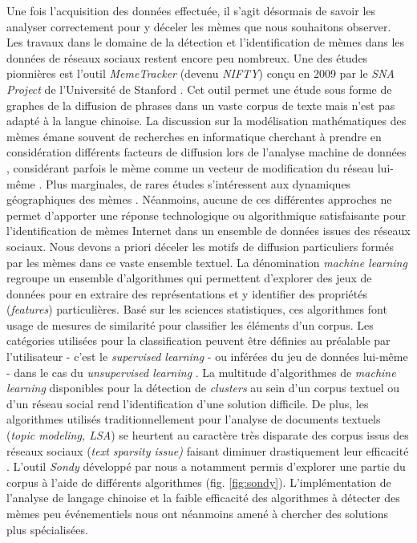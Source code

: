 Une fois l{\textquoteright}acquisition des données effectuée, il s{\textquoteright}agit désormais de savoir les analyser correctement pour y déceler les mèmes que nous souhaitons observer. Les travaux dans le domaine de la détection et l{\textquoteright}identification de mèmes dans les données de réseaux sociaux restent encore peu nombreux. Une des études pionnières est l{\textquoteright}outil \textit{MemeTracker }(devenu \textit{NIFTY}) con\c{c}u en 2009 par le \textit{SNA Project }de l{\textquoteright}Université de Stanford \citep{Leskovec2009}. Cet outil permet une étude sous forme de graphes de la diffusion de phrases dans un vaste corpus de texte mais n{\textquoteright}est pas adapté à la langue chinoise. La discussion sur la modélisation mathématiques des mèmes \citep{Ahmad2006, Nye2011} émane souvent de recherches en informatique cherchant à prendre en considération différents facteurs de diffusion lors de l{\textquoteright}analyse machine de données \citep{Zubiaga2011, Wang2011}, considérant parfois le mème comme un vecteur de modification du réseau lui-m\^eme \citep{Ienco2010}. Plus marginales, de rares études s{\textquoteright}intéressent aux dynamiques géographiques des mèmes \citep{Kamath2013}. Néanmoins, aucune de ces différentes approches ne permet d{\textquoteright}apporter une réponse technologique ou algorithmique satisfaisante pour l{\textquoteright}identification de mèmes Internet dans un ensemble de données issues des réseaux sociaux. Nous devons a priori déceler les motifs de diffusion particuliers formés par les mèmes dans ce vaste ensemble textuel. La dénomination \textit{machine learning }regroupe un ensemble d{\textquoteright}algorithmes qui permettent d{\textquoteright}explorer des jeux de données pour en extraire des représentations et y identifier des propriétés (\textit{features}) particulières. Basé sur les sciences statistiques, ces algorithmes font usage de mesures de similarité pour classifier les éléments d{\textquoteright}un corpus. Les catégories utilisées pour la classification peuvent \^etre définies au préalable par l{\textquoteright}utilisateur - c{\textquoteright}est le \textit{supervised learning} - ou inférées du jeu de données lui-m\^eme - dans le cas du \textit{unsupervised learning} \citep{Breiman2001}. La multitude d{\textquoteright}algorithmes de \textit{machine learning }disponibles pour la détection de \textit{clusters} au sein d{\textquoteright}un corpus textuel ou d{\textquoteright}un réseau social \citep{Nettleton2013, Robins2013} rend l{\textquoteright}identification d{\textquoteright}une solution difficile. De plus, les algorithmes utilisés traditionnellement pour l{\textquoteright}analyse de documents textuels (\textit{topic modeling, LSA}) se heurtent au caractère très disparate des corpus issus des réseaux sociaux (\textit{text sparsity issue) }faisant diminuer drastiquement leur efficacité \citep{Hong2010}. L'outil \textit{Sondy} développé par \cite{Guille2013a} nous a notamment permis d'explorer une partie du corpus à l'aide de différents algorithmes (fig. \ref{fig:sondy}). L'implémentation de l'analyse de langage chinoise et la faible efficacité des algorithmes à détecter des mèmes peu événementiels nous ont néanmoins amené à chercher des solutions plus spécialisées.


